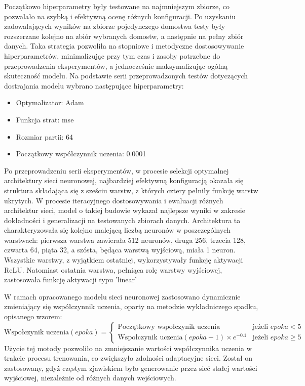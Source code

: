 \documentclass[a4paper,twoside,12pt]{book}
\begin{document}
Początkowo hiperparametry były testowane na najmniejszym zbiorze, co pozwalało na szybką i efektywną ocenę różnych konfiguracji. Po uzyskaniu zadowalających wyników na zbiorze pojedynczego domostwa testy były rozszerzane kolejno na zbiór wybranych domostw, a następnie na pełny zbiór danych. Taka strategia pozwoliła na stopniowe i metodyczne dostosowywanie hiperparametrów, minimalizując przy tym czas i zasoby potrzebne do przeprowadzenia eksperymentów, a jednocześnie maksymalizując ogólną skuteczność modelu. Na podstawie serii przeprowadzonych testów dotyczących dostrajania modelu wybrano następujące hiperparametry:

\begin{itemize}
  \item Optymalizator: Adam
  \item Funkcja strat: mse
  \item Rozmiar partii: 64
  \item Początkowy współczynnik uczenia: 0.0001
\end{itemize}


Po przeprowadzeniu serii eksperymentów, w procesie selekcji optymalnej architektury sieci neuronowej, najbardziej efektywną konfiguracją okazała się struktura składająca się z sześciu warstw, z których cztery pełniły funkcję warstw ukrytych. W procesie iteracyjnego dostosowywania i ewaluacji różnych architektur sieci, model o takiej budowie wykazał najlepsze wyniki w zakresie dokładności i generalizacji na testowanych zbiorach danych. Architektura ta charakteryzowała się kolejno malejącą liczbą neuronów w poszczególnych warstwach: pierwsza warstwa zawierała 512 neuronów, druga 256, trzecia 128, czwarta 64, piąta 32, a szósta, będąca warstwą wyjściową, miała 1 neuron. Wszystkie warstwy, z wyjątkiem ostatniej, wykorzystywały funkcję aktywacji ReLU. Natomiast ostatnia warstwa, pełniąca rolę warstwy wyjściowej, zastosowała funkcję aktywacji typu 'linear'


W ramach opracowanego modelu sieci neuronowej zastosowano dynamicznie zmieniający się współczynnik uczenia, oparty na metodzie wykładniczego spadku, opisanego wzorem:
\begin{equation}
  \text{Wspołczynik uczenia}(epoka) =
  \begin{cases}
    \text{Początkowy wspołczynik uczenia}                 & \text{jeżeli } epoka < 5    \\
    \text{Wspołczynik uczenia}(epoka - 1) \times e^{-0.1} & \text{jeżeli } epoka \geq 5
  \end{cases}
\end{equation}
Użycie tej motody pozwoliło na zmniejszanie wartości współczynnika uczenia w trakcie procesu trenowania, co zwiększyło zdolności adaptacyjne sieci. Został on zastosowany, gdyż częstym zjawiskiem było generowanie przez sieć stałej wartości wyjściowej, niezależnie od różnych danych wejściowych.
\end{document}
